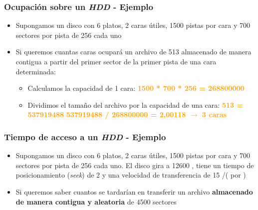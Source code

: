 \begin{frame}
  \frametitle{Ocupación sobre un \textit{HDD} - Ejemplo}
  \begin{itemize}
    \item Supongamos un disco con 6 platos, 2 caras útiles, 1500 pistas por cara y 700 sectores por pista de 256 \bytes \hspace{1pt} cada uno
    \item Si queremos cuantas caras ocupará un archivo de 513 \mebishort\bytes almacenado de manera contigua a partir del primer sector de la primer pista de una cara determinada:
    \begin{itemize}
      \item Calculamos la capacidad de 1 cara:
      \linebreak      
      \hspace{35pt} \textcolor{orange}{\textbf{1500 * 700 * 256 \bytes \hspace{1pt} = 268800000 \bytes}}
      \linebreak
      \item Dividimos el tamaño del archivo por la capacidad de una cara:
      \hspace{35pt} \textcolor{orange}{\textbf{513 \mebishort\bytesshort = 537919488 \bytes}}
      \linebreak
      \hspace{35pt} \textcolor{orange}{\textbf{537919488 / 268800000 = 2,00118  $\rightarrow$ 3 caras}}
    \end{itemize}
  \end{itemize}
\end{frame}

\begin{frame}
  \frametitle{Tiempo de acceso a un \textit{HDD} - Ejemplo}
  \begin{itemize}
    \item Supongamos un disco con 6 platos, 2 caras útiles, 1500 pistas por cara y 700 sectores por pista de 256 \bytes \hspace{1pt} cada uno. El disco gira a 12600 \rpm, tiene un tiempo de posicionamiento (\textit{seek}) de 2 \milisegundos y una velocidad de transferencia de 15 \mebishort\bitsshort/\s (\mebi\bits \hspace{1pt} por \segundo)
    \item Si queremos saber cuantos \milisegundos se tardarían en transferir un archivo \textbf{almacenado de manera contigua y aleatoria} de 4500 sectores
  \end{itemize}
\end{frame}


